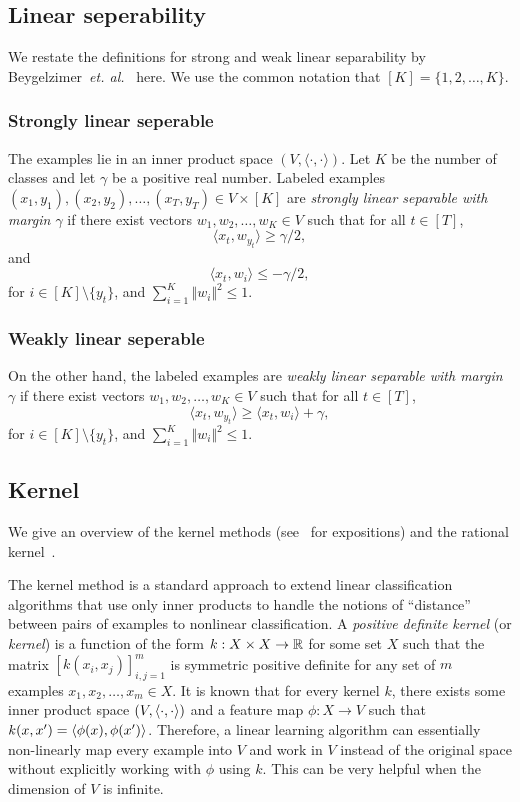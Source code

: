 \subsection{Linear seperability}
We restate the definitions for strong and weak linear separability by Beygelzimer~{\em et. al.}~\cite{BeygelzimerPSTWZ2019-separable} here.  
We use the common notation that $[K]=\{1,2,\ldots,K\}$.

\subsubsection{Strongly linear seperable}
The examples lie in an inner product space $(V,\langle\cdot,\cdot\rangle)$.  Let $K$ be the number of classes and let $\gamma$ be a positive real number.
Labeled examples
$(x_1,y_1),(x_2,y_2),\ldots,(x_T,y_T)\in V\times[K]$
are {\em strongly linear separable with margin $\gamma$} if there exist vectors $w_1,w_2,\ldots,w_K\in V$ such that
for all $t\in[T]$,
\[
\langle x_t, w_{y_t}\rangle \geq \gamma/2,
\]
and
\[
\langle x_t, w_i\rangle \leq -\gamma/2,
\]
for $i\in [K]\setminus \{y_t\}$,
and $\sum_{i=1}^K \Vert w_i \Vert^2\leq 1$.
\subsubsection{Weakly linear seperable}
On the other hand, the labeled examples are {\em weakly linear separable with margin $\gamma$} if there exist vectors $w_1,w_2,\ldots,w_K\in V$ such that
for all $t\in[T]$,
\[
\langle x_t, w_{y_t}\rangle \geq \langle x_t, w_i\rangle + \gamma,
\]
for $i\in [K]\setminus \{y_t\}$, and $\sum_{i=1}^K \Vert w_i \Vert^2\leq 1$.

\subsection{Kernel}
We give an overview of the kernel methods (see~\cite{ShaweTaylorC2004-kernel-methods} for expositions) and the rational kernel~\cite{ShalevShwartzSS2011-kernel-based}.

The kernel method is a standard approach to extend linear classification algorithms that use only inner products to handle the notions of ``distance'' between pairs of examples to nonlinear classification.
A {\em positive definite kernel} (or {\em kernel}) is a function of the form $k: X\times X\rightarrow {\mathbb{R}}$ for some set $X$ such that the matrix $[k(x_i,x_j)]_{i,j=1}^m$ is symmetric positive definite for any set of $m$ examples $x_1,x_2,\ldots,x_m\in X$.  It is known that for every kernel $k$, there exists some inner product space $(V,\langle \cdot,\cdot\rangle)$ and a feature map $\phi:X\rightarrow V$ such that $k(x,x')=\langle \phi(x),\phi(x')\rangle$.  Therefore, a linear learning algorithm can essentially non-linearly map every example into $V$ and work in $V$ instead of the original space without explicitly working with $\phi$ using $k$.  This can be very helpful when the dimension of $V$ is infinite.

